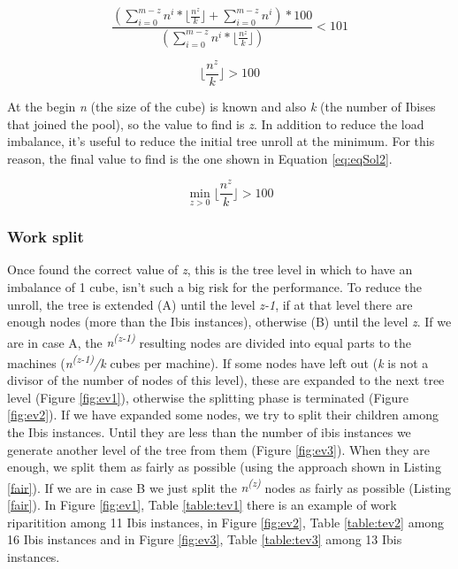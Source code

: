 \documentclass[a4paper]{article}
\begin{document}
\begin{equation} 
\label{eq:eqIne}
\frac{(\sum_{i=0}^{m-z}{n^i}*\lfloor\frac{n^z}{k}\rfloor +  \sum_{i=0}^{m-z}{n^i})*100}{(\sum_{i=0}^{m-z}{n^i}*\lfloor\frac{n^z}{k}\rfloor)} < 101
\end{equation}
\FloatBarrier

\begin{equation} 
\label{eq:eqSol}
\lfloor\frac{n^z}{k}\rfloor > 100
\end{equation}
\FloatBarrier

At the begin \textit{n} (the size of the cube) is known and also \textit{k} (the number of Ibises that joined the pool), so the value to find is \textit{z}. In addition to reduce the load imbalance, it's useful to reduce the initial tree unroll at the minimum. For this reason, the final value to find is the one shown in Equation \ref{eq:eqSol2}.

\begin{equation} 
\label{eq:eqSol2}
\min_{z>0} \lfloor\frac{n^z}{k}\rfloor > 100
\end{equation}
\FloatBarrier

\subsubsection{Work split}
\label{sec:ws}

Once found the correct value of \textit{z}, this is the tree level in which to have an imbalance of 1 cube, isn't such a big risk for the performance. 
To reduce the unroll, the tree is extended (A) until the level \textit{z-1}, if at that level there are enough nodes (more than the Ibis instances), otherwise (B) until the level \textit{z}. If we are in case A, the \textit{n\textsuperscript{(z-1)}} resulting nodes are divided into equal parts to the machines (\textit{n\textsuperscript{(z-1)}/k} cubes per machine). If some nodes have left out (\textit{k} is not a divisor of the number of nodes of this level), these are expanded to the next tree level (Figure \ref{fig:ev1}), otherwise the splitting phase is terminated (Figure \ref{fig:ev2}). If we have expanded some nodes, we try to split their children among the Ibis instances. Until they are less than the number of ibis instances we generate another level of the tree from them (Figure \ref{fig:ev3}). When they are enough, we split them as fairly as possible (using the approach shown in Listing \ref{fair}). If we are in case B we just split the \textit{n\textsuperscript{(z)}} nodes as fairly as possible (Listing \ref{fair}). In Figure \ref{fig:ev1}, Table \ref{table:tev1} there is an example of work riparitition among 11 Ibis instances, in Figure \ref{fig:ev2}, Table \ref{table:tev2} among 16 Ibis instances and in Figure \ref{fig:ev3}, Table \ref{table:tev3} among 13 Ibis instances.
\end{document}
